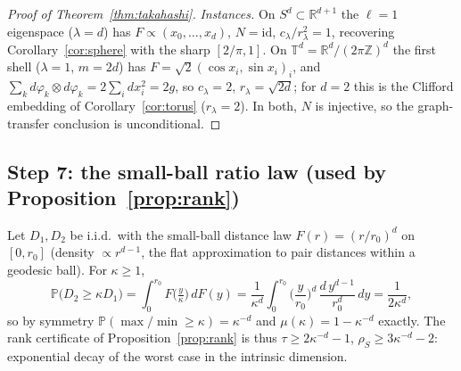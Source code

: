 \documentclass[11pt]{article}
\theoremstyle{remark}
\begin{document}
\begin{proof}[Proof of Theorem~\ref{thm:takahashi}]
\emph{Instances.} On $S^d\subset\mathbb R^{d+1}$ the $\ell{=}1$ eigenspace
($\lambda=d$) has $F\propto(x_0,\dots,x_d)$, $N=\mathrm{id}$,
$c_\lambda/r_\lambda^2=1$, recovering Corollary~\ref{cor:sphere} with the sharp
$[2/\pi,1]$. On $\mathbb T^d=\mathbb R^d/(2\pi\mathbb Z)^d$ the first shell
($\lambda=1$, $m=2d$) has $F=\sqrt2(\cos x_i,\sin x_i)_i$, and
$\sum_k d\varphi_k\otimes d\varphi_k=2\sum_i dx_i^2=2g$, so $c_\lambda=2$,
$r_\lambda=\sqrt{2d}$; for $d=2$ this is the Clifford embedding of
Corollary~\ref{cor:torus} ($r_\lambda=2$). In both, $N$ is injective, so the
graph-transfer conclusion is unconditional.
\end{proof}

\subsection*{Step 7: the small-ball ratio law (used by Proposition~\ref{prop:rank})}
Let $D_1,D_2$ be i.i.d.\ with the small-ball distance law
$F(r)=(r/r_0)^d$ on $[0,r_0]$ (density $\propto r^{d-1}$, the flat
approximation to pair distances within a geodesic ball). For $\kappa\ge1$,
\[
\mathbb P\big(D_2\ge\kappa D_1\big)
=\int_0^{r_0}\!F\!\big(\tfrac{y}{\kappa}\big)\,dF(y)
=\frac{1}{\kappa^d}\int_0^{r_0}\Big(\frac{y}{r_0}\Big)^{d}\,
\frac{d\,y^{d-1}}{r_0^{d}}\,dy
=\frac{1}{2\kappa^d},
\]
so by symmetry $\mathbb P(\max/\min\ge\kappa)=\kappa^{-d}$ and
$\mu(\kappa)=1-\kappa^{-d}$ exactly. The rank certificate of
Proposition~\ref{prop:rank} is thus $\tau\ge2\kappa^{-d}-1$,
$\rho_S\ge3\kappa^{-d}-2$: exponential decay of the worst case in the
intrinsic dimension.
\end{document}
